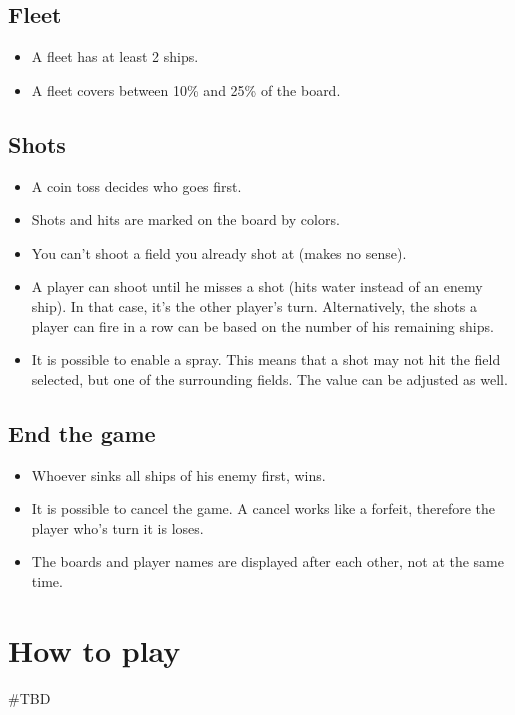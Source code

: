 \documentclass[12pt]{scrartcl}
\begin{document}
	\subsection{Fleet}
	\begin{itemize}
		\item A fleet has at least 2 ships.
		\item A fleet covers between 10\% and 25\% of the board.
	\end{itemize}

	\subsection{Shots}
	\begin{itemize}
		\item A coin toss decides who goes first.
		\item Shots and hits are marked on the board by colors.
		\item You can't shoot a field you already shot at (makes no sense).
		\item A player can shoot until he misses a shot (hits water instead of an enemy ship). In that case, it's the other player's turn. Alternatively, the shots a player can fire in a row can be based on the number of his remaining ships.
		\item It is possible to enable a spray. This means that a shot may not hit the field selected, but one of the surrounding fields. The value can be adjusted as well.
	\end{itemize}

	\subsection{End the game}
	\begin{itemize}
		\item Whoever sinks all ships of his enemy first, wins.
		\item It is possible to cancel the game. A cancel works like a forfeit, therefore the player who's turn it is loses.
		\item The boards and player names are displayed after each other, not at the same time.
	\end{itemize}


	\clearpage


	\section{How to play}\label{sec:how_to_play}
	\#TBD
\end{document}
